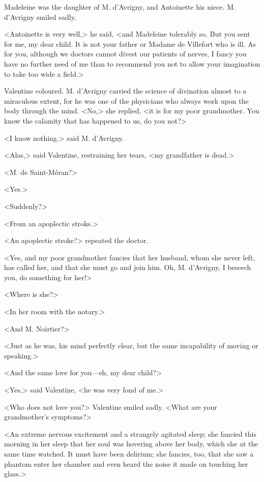  Madeleine was the daughter of M. d'Avrigny, and Antoinette his niece. M. d'Avrigny smiled sadly. 

 <Antoinette is very well,> he said, <and Madeleine tolerably so. But you sent for me, my dear child. It is not your father or Madame de Villefort who is ill. As for you, although we doctors cannot divest our patients of nerves, I fancy you have no further need of me than to recommend you not to allow your imagination to take too wide a field.> 

 Valentine coloured. M. d'Avrigny carried the science of divination almost to a miraculous extent, for he was one of the physicians who always work upon the body through the mind.  <No,> she replied, <it is for my poor grandmother. You know the calamity that has happened to us, do you not?> 

 <I know nothing.> said M. d'Avrigny. 

 <Alas,> said Valentine, restraining her tears, <my grandfather is dead.> 

 <M. de Saint-Méran?> 

 <Yes.> 

 <Suddenly?> 

 <From an apoplectic stroke.> 

 <An apoplectic stroke?> repeated the doctor. 

 <Yes, and my poor grandmother fancies that her husband, whom she never left, has called her, and that she must go and join him. Oh, M. d'Avrigny, I beseech you, do something for her!> 

 <Where is she?> 

 <In her room with the notary.> 

 <And M. Noirtier?> 

 <Just as he was, his mind perfectly clear, but the same incapability of moving or speaking.> 

 <And the same love for you—eh, my dear child?> 

 <Yes,> said Valentine, <he was very fond of me.> 

 <Who does not love you?> Valentine smiled sadly. <What are your grandmother's symptoms?> 

 <An extreme nervous excitement and a strangely agitated sleep; she fancied this morning in her sleep that her soul was hovering above her body, which she at the same time watched. It must have been delirium; she fancies, too, that she saw a phantom enter her chamber and even heard the noise it made on touching her glass.> 


